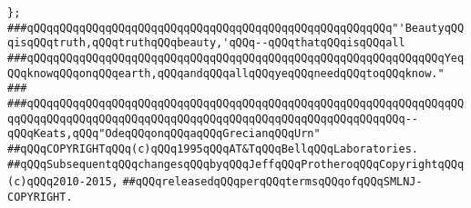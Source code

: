 \newline
\verb|};|\newline
\newline
\newline
\newline
\verb|###qQQqqQQqqQQqqQQqqQQqqQQqqQQqqQQqqQQqqQQqqQQqqQQqqQQqqQQq"'BeautyqQQqisqQQqtruth,qQQqtruthqQQqbeauty,'qQQq--qQQqthatqQQqisqQQqall|\newline
\verb|###qQQqqQQqqQQqqQQqqQQqqQQqqQQqqQQqqQQqqQQqqQQqqQQqqQQqqQQqqQQqqQQqYeqQQqknowqQQqonqQQqearth,qQQqandqQQqallqQQqyeqQQqneedqQQqtoqQQqknow."|\newline
\verb|###|\newline
\verb|###qQQqqQQqqQQqqQQqqQQqqQQqqQQqqQQqqQQqqQQqqQQqqQQqqQQqqQQqqQQqqQQqqQQqqQQqqQQqqQQqqQQqqQQqqQQqqQQqqQQqqQQqqQQqqQQqqQQqqQQqqQQqqQQq--qQQqKeats,qQQq"OdeqQQqonqQQqaqQQqGrecianqQQqUrn"|\newline
\newline
\newline
\newline
\newline
\verb|##qQQqCOPYRIGHTqQQq(c)qQQq1995qQQqAT&TqQQqBellqQQqLaboratories.|\newline
\verb|##qQQqSubsequentqQQqchangesqQQqbyqQQqJeffqQQqProtheroqQQqCopyrightqQQq(c)qQQq2010-2015,|\newline
\verb|##qQQqreleasedqQQqperqQQqtermsqQQqofqQQqSMLNJ-COPYRIGHT.|\newline

